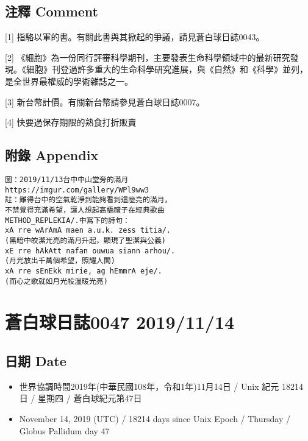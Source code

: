 \documentclass[a5paper, 12pt
]{book}
\providecommand{\tightlist}{%
  \setlength{\itemsep}{0pt}\setlength{\parskip}{0pt}}
\begin{document}
\hypertarget{ux6ce8ux91cb-comment-39}{%
\subsection{注釋 Comment}\label{ux6ce8ux91cb-comment-39}}

{[}1{]} 指駱以軍的書。有關此書與其掀起的爭議，請見蒼白球日誌0043。

{[}2{]}
《細胞》為一份同行評審科學期刊，主要發表生命科學領域中的最新研究發現。《細胞》刊登過許多重大的生命科學研究進展，與《自然》和《科學》並列，是全世界最權威的學術雜誌之一。

{[}3{]} 新台幣計價。有關新台幣請參見蒼白球日誌0007。

{[}4{]} 快要過保存期限的熟食打折販賣

\hypertarget{ux9644ux9304-appendix-38}{%
\subsection{附錄 Appendix}\label{ux9644ux9304-appendix-38}}

\begin{verbatim}
圖：2019/11/13台中中山堂旁的滿月 
https://imgur.com/gallery/WPl9ww3
註：難得台中的空氣乾淨到能夠看到這麼亮的滿月，
不禁覺得充滿希望，讓人想起高橋禮子在經典歌曲
METHOD_REPLEKIA/.中寫下的詩句：
xA rre wArAmA maen a.u.k. zess titia/. 
(黑暗中皎潔光亮的滿月升起，顯現了聖潔與公義)
xE rre hAkAtt nafan ouwua siann arhou/. 
(月光放出千萬個希望，照耀人間)
xA rre sEnEkk mirie, ag hEmmrA eje/. 
(而心之歌就如月光般溫暖光亮)
\end{verbatim}

\hypertarget{ux84bcux767dux7403ux65e5ux8a8c0047-20191114}{%
\section{蒼白球日誌0047
2019/11/14}\label{ux84bcux767dux7403ux65e5ux8a8c0047-20191114}}

\hypertarget{ux65e5ux671f-date-46}{%
\subsection{日期 Date}\label{ux65e5ux671f-date-46}}

\begin{itemize}
\tightlist
\item
  世界協調時間2019年(中華民國108年，令和1年)11月14日 / Unix 紀元 18214
  日 / 星期四 / 蒼白球紀元第47日
\item
  November 14, 2019 (UTC) / 18214 days since Unix Epoch / Thursday /
  Globus Pallidum day 47
\end{itemize}
\end{document}

